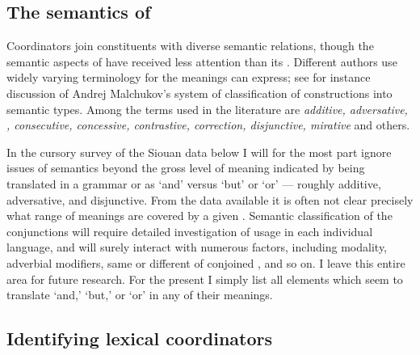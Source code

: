 \documentclass[output=paper]{LSP/langsci}
\begin{document}
\subsection{The semantics of }

\largerpage[-1]
Coordinators join constituents with diverse semantic relations, though the semantic aspects of  have received less attention than its . Different authors use widely varying terminology for the meanings  can express; see for instance  discussion of Andrej Malchukov's system of classification of  constructions into semantic types. Among the terms used in the literature are \textit{additive, adversative, , consecutive, concessive, contrastive, correction, disjunctive, mirative} and others.

In the cursory survey of the Siouan data below I will for the most part ignore issues of semantics beyond the gross level of meaning indicated by being translated in a grammar or  as `and' versus `but' or `or' --- roughly additive, adversative, and disjunctive. From the data available it is often not clear precisely what range of meanings are covered by a given . Semantic classification of the conjunctions will require detailed investigation of usage in each individual language, and will surely interact with numerous factors, including modality, adverbial modifiers, same or different  of conjoined , and so on. I leave this entire area for future research. For the present I simply list all elements which seem to translate `and,' `but,' or `or' in any of their meanings.

\subsection{Identifying lexical coordinators}
\end{document}
